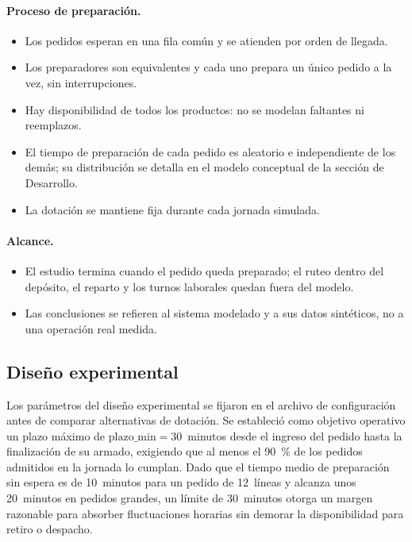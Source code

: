 \paragraph{Proceso de preparación.}
\begin{itemize}
  \item Los pedidos esperan en una fila común y se atienden por orden de llegada.
  \item Los preparadores son equivalentes y cada uno prepara un único pedido a la vez, sin interrupciones.
  \item Hay disponibilidad de todos los productos: no se modelan faltantes ni reemplazos.
  \item El tiempo de preparación de cada pedido es aleatorio e independiente de los demás; su distribución se detalla en el modelo conceptual de la sección de Desarrollo.
  \item La dotación se mantiene fija durante cada jornada simulada.
\end{itemize}

\paragraph{Alcance.}
\begin{itemize}
  \item El estudio termina cuando el pedido queda preparado; el ruteo dentro del depósito, el reparto y los turnos laborales quedan fuera del modelo.
  \item Las conclusiones se refieren al sistema modelado y a sus datos sintéticos, no a una operación real medida.
\end{itemize}
\subsection{Diseño experimental}
\label{sec:diseno-experimental}

Los parámetros del diseño experimental se fijaron en el archivo de configuración antes de comparar alternativas de dotación.
Se estableció como objetivo operativo un plazo máximo de $\mathrm{plazo\_min} = 30$~minutos desde el ingreso del pedido hasta la finalización de su armado, exigiendo que al menos el 90~\% de los pedidos admitidos en la jornada lo cumplan.
Dado que el tiempo medio de preparación sin espera es de 10~minutos para un pedido de 12~líneas y alcanza unos 20~minutos en pedidos grandes, un límite de 30~minutos otorga un margen razonable para absorber fluctuaciones horarias sin demorar la disponibilidad para retiro o despacho.

